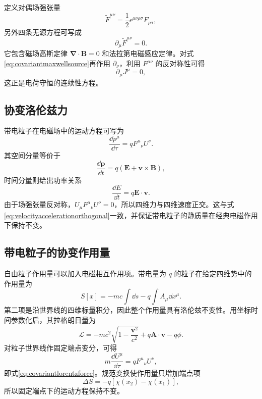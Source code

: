 \documentclass[style=classic,color=full]{lc-article}
\begin{document}
定义对偶场强张量
\begin{equation}
  \widetilde F^{\mu\nu}
  =\frac{1}{2}\epsilon^{\mu\nu\rho\sigma}
  F_{\rho\sigma},
\end{equation}
另外四条无源方程可写成
\begin{equation}
  \boxed{\partial_\mu\widetilde F^{\mu\nu}=0.}
  \label{eq:covariantmaxwellhomogeneous}
\end{equation}
它包含磁场高斯定律 $\bm\nabla\mathbin{\cdot}\bm B=0$ 和法拉第电磁感应定律。对式\eqref{eq:covariantmaxwellsource}再作用 $\partial_\nu$，利用 $F^{\mu\nu}$ 的反对称性可得
\begin{equation}
  \partial_\mu J^\mu=0,
  \label{eq:chargecontinuity}
\end{equation}
这正是电荷守恒的连续性方程。

\subsection{协变洛伦兹力}

带电粒子在电磁场中的运动方程可写为
\begin{equation}
  \boxed{
  \frac{\dd p^\mu}{\dd\tau}
  =q{F^\mu}_{\nu}U^\nu.}
  \label{eq:covariantlorentzforce}
\end{equation}
其空间分量等价于
\begin{equation}
  \frac{\dd\bm p}{\dd t}
  =q(\bm E+\bm v\times\bm B),
\end{equation}
时间分量则给出功率关系
\begin{equation}
  \frac{\dd E}{\dd t}=q\bm E\mathbin{\cdot}\bm v.
\end{equation}
由于场强张量反对称，$U_\mu {F^\mu}_{\nu}U^\nu=0$，所以四维力与四维速度正交。这与式\eqref{eq:velocityaccelerationorthogonal}一致，并保证带电粒子的静质量在经典电磁作用下保持不变。

\subsection{带电粒子的协变作用量}

自由粒子作用量可以加入电磁相互作用项。带电量为 $q$ 的粒子在给定四维势中的作用量为
\begin{equation}
  S[x]
  =-mc\int\dd s-q\int A_\mu\dd x^\mu.
  \label{eq:chargedparticleaction}
\end{equation}
第二项是沿世界线的四维标量积分，因此整个作用量具有洛伦兹不变性。用坐标时间参数化后，其拉格朗日量为
\begin{equation}
  \mathcal L
  =-mc^2\sqrt{1-\frac{\bm v^2}{c^2}}
  +q\bm A\mathbin{\cdot}\bm v-q\phi.
  \label{eq:chargedparticlelagrangian}
\end{equation}
对粒子世界线作固定端点变分，可得
\begin{equation}
  m\frac{\dd U^\mu}{\dd\tau}
  =q{F^\mu}_{\nu}U^\nu,
\end{equation}
即式\eqref{eq:covariantlorentzforce}。规范变换使作用量只增加端点项
\begin{equation}
  \Delta S=-q[\chi(x_2)-\chi(x_1)],
\end{equation}
所以固定端点下的运动方程保持不变。
\end{document}
